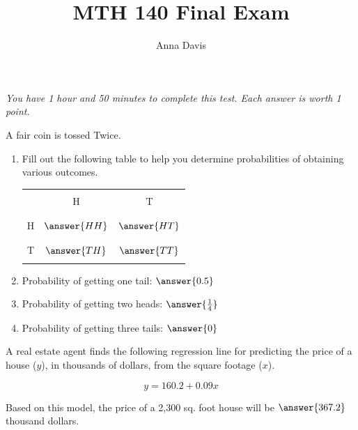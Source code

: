 \documentclass{ximera}
\author{Anna Davis} \title{MTH 140 Final Exam}
\begin{document}
\begin{abstract}

\end{abstract}
\maketitle
 \textit{You have 1 hour and 50 minutes to complete this test.  Each answer is worth 1 point.}
\begin{problem}\label{prob:140finalprob1}
A fair coin is tossed Twice.  
\begin{enumerate}
    \item Fill out the following table to help you determine probabilities of obtaining various outcomes.
    
\begin{center}
\begin{tabular}{|c|c|c|}
 \hline
 &&   \\
 & H& T  \\
 &&   \\
  \hline
  &&\\
 H&$\answer{HH}$&$\answer{HT}$ \\
  && \\
 \hline
  &&\\
 T&$\answer{TH}$&$\answer{TT}$ \\
  && \\
 \hline
 \end{tabular}
\end{center}    
\item Probability of getting one tail: $\answer{0.5}$

\item Probability of getting two heads: $\answer{\frac{1}{4}}$
\item Probability of getting three tails: $\answer{0}$
\end{enumerate}
\end{problem}

\begin{problem}\label{prob:140finalprob2}
A real estate agent finds the following regression line for predicting the price of a house ($y$), in thousands of dollars, from the square footage ($x$).

$$y = 160.2 + 0.09x$$

Based on this model, the price of a 2,300 sq. foot house will be $\answer{367.2}$ thousand dollars.
\end{problem}
\end{document}
